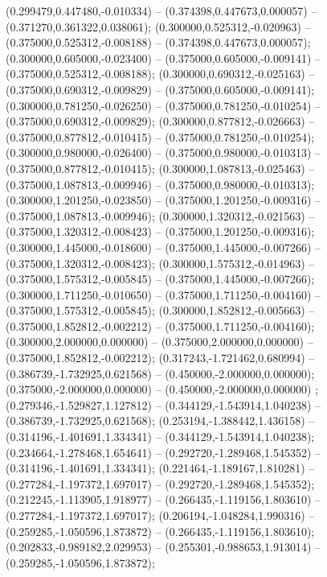  (0.299479,0.447480,-0.010334) -- (0.374398,0.447673,0.000057) -- (0.371270,0.361322,0.038061);
 (0.300000,0.525312,-0.020963) -- (0.375000,0.525312,-0.008188) -- (0.374398,0.447673,0.000057);
 (0.300000,0.605000,-0.023400) -- (0.375000,0.605000,-0.009141) -- (0.375000,0.525312,-0.008188);
 (0.300000,0.690312,-0.025163) -- (0.375000,0.690312,-0.009829) -- (0.375000,0.605000,-0.009141);
 (0.300000,0.781250,-0.026250) -- (0.375000,0.781250,-0.010254) -- (0.375000,0.690312,-0.009829);
 (0.300000,0.877812,-0.026663) -- (0.375000,0.877812,-0.010415) -- (0.375000,0.781250,-0.010254);
 (0.300000,0.980000,-0.026400) -- (0.375000,0.980000,-0.010313) -- (0.375000,0.877812,-0.010415);
 (0.300000,1.087813,-0.025463) -- (0.375000,1.087813,-0.009946) -- (0.375000,0.980000,-0.010313);
 (0.300000,1.201250,-0.023850) -- (0.375000,1.201250,-0.009316) -- (0.375000,1.087813,-0.009946);
 (0.300000,1.320312,-0.021563) -- (0.375000,1.320312,-0.008423) -- (0.375000,1.201250,-0.009316);
 (0.300000,1.445000,-0.018600) -- (0.375000,1.445000,-0.007266) -- (0.375000,1.320312,-0.008423);
 (0.300000,1.575312,-0.014963) -- (0.375000,1.575312,-0.005845) -- (0.375000,1.445000,-0.007266);
 (0.300000,1.711250,-0.010650) -- (0.375000,1.711250,-0.004160) -- (0.375000,1.575312,-0.005845);
 (0.300000,1.852812,-0.005663) -- (0.375000,1.852812,-0.002212) -- (0.375000,1.711250,-0.004160);
 (0.300000,2.000000,0.000000) -- (0.375000,2.000000,0.000000) -- (0.375000,1.852812,-0.002212);
 (0.317243,-1.721462,0.680994) -- (0.386739,-1.732925,0.621568) -- (0.450000,-2.000000,0.000000);
 (0.375000,-2.000000,0.000000) -- (0.450000,-2.000000,0.000000) ;
 (0.279346,-1.529827,1.127812) -- (0.344129,-1.543914,1.040238) -- (0.386739,-1.732925,0.621568);
 (0.253194,-1.388442,1.436158) -- (0.314196,-1.401691,1.334341) -- (0.344129,-1.543914,1.040238);
 (0.234664,-1.278468,1.654641) -- (0.292720,-1.289468,1.545352) -- (0.314196,-1.401691,1.334341);
 (0.221464,-1.189167,1.810281) -- (0.277284,-1.197372,1.697017) -- (0.292720,-1.289468,1.545352);
 (0.212245,-1.113905,1.918977) -- (0.266435,-1.119156,1.803610) -- (0.277284,-1.197372,1.697017);
 (0.206194,-1.048284,1.990316) -- (0.259285,-1.050596,1.873872) -- (0.266435,-1.119156,1.803610);
 (0.202833,-0.989182,2.029953) -- (0.255301,-0.988653,1.913014) -- (0.259285,-1.050596,1.873872);

